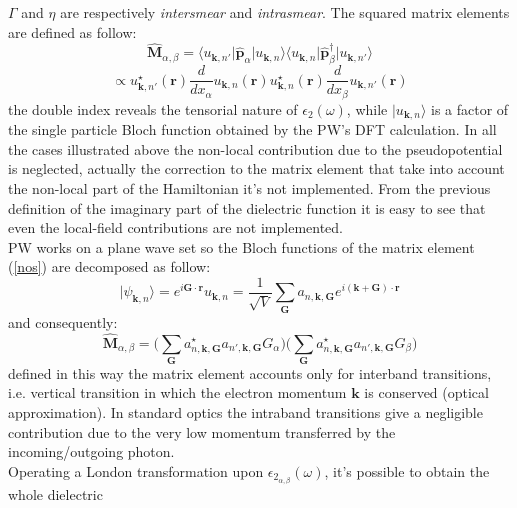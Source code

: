\documentclass[twocolumn]{article}
\begin{document}
$\Gamma$ and $\eta$ are respectively \emph{intersmear} and \emph{intrasmear}. 
The squared matrix elements are defined as follow:
\begin{equation}
\hat{\textbf{M}}_{\alpha,\beta}=\langle u_{\textbf{k},n'}\vert\hat{\textbf{p}}_{\alpha}\vert u_{\textbf{k},n}\rangle
\langle u_{\textbf{k},n}\vert\hat{\textbf{p}}_{\beta}^{\dagger}\vert u_{\textbf{k},n'}\rangle
\label{nos}
\end{equation}
\begin{equation}
\propto u_{\textbf{k},n'}^{\star}(\textbf{r})\frac{d}{d x_{\alpha}}u_{\textbf{k},n}(\textbf{r})
u_{\textbf{k},n}^{\star}(\textbf{r})\frac{d}{d x_{\beta}}u_{\textbf{k},n'}(\textbf{r})
\end{equation}
the double index reveals the tensorial nature of $\epsilon_{2}(\omega)$, while $\vert u_{\textbf{k},n}\rangle$ is a
factor of the single particle Bloch function obtained by the PW's DFT calculation.
In all the cases illustrated above the non-local contribution due to the pseudopotential is neglected, actually the
correction to the matrix element that take into account the non-local part of the Hamiltonian it's not implemented.
From the previous definition of the imaginary part of the dielectric function it is easy to see that even the local-field
contributions are not implemented.\\
PW works on a plane wave set so the Bloch functions of the matrix element (\ref{nos}) are decomposed as follow:
\begin{equation}
\vert \psi_{\textbf{k},n}\rangle=e^{i\textbf{G}\cdot\textbf{r}}u_{\textbf{k},n}=\frac{1}{\sqrt{V}}\sum_{\textbf{G}}a_{n,\textbf{k},\textbf{G}}
e^{i(\textbf{k}+\textbf{G})\cdot\textbf{r}}
\end{equation}
and consequently:
\begin{equation}
\hat{\textbf{M}}_{\alpha,\beta}=\bigg(\sum_{\textbf{G}}a^{\star}_{n,\textbf{k},\textbf{G}}a_{n',\textbf{k},\textbf{G}}
G_{\alpha}\bigg) \bigg(\sum_{\textbf{G}}a^{\star}_{n,\textbf{k},\textbf{G}}a_{n',\textbf{k},\textbf{G}}
G_{\beta}\bigg)
\end{equation}
defined in this way the matrix element accounts only for interband transitions, i.e. vertical transition in which the
electron momentum $\textbf{k}$ is conserved (optical approximation). In standard optics the intraband transitions give a 
negligible contribution due to the very low momentum transferred by the incoming/outgoing photon.\\
Operating a London transformation upon $\epsilon_{2_{\alpha,\beta}}(\omega)$, it's possible to obtain the whole dielectric
\end{document}

